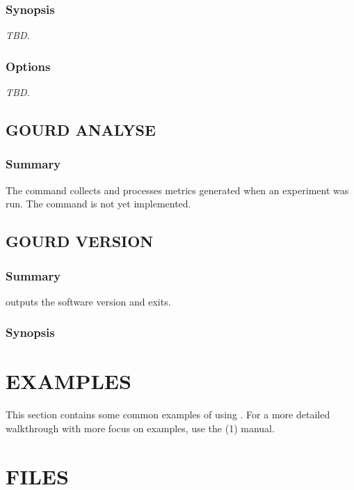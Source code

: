 \documentclass[a4paper,english]{article}
\begin{document}
            \subsubsection{Synopsis}
                \emph{TBD.}

            \subsubsection{Options}
                \emph{TBD.}


        \subsection{GOURD ANALYSE}

            \subsubsection{Summary}
                The   command collects and processes metrics generated
                when an experiment was run.
                The command is not yet implemented.

        \subsection{GOURD VERSION}

            \subsubsection{Summary}
                  outputs the software version and exits.

            \subsubsection{Synopsis}
                  


    \section{EXAMPLES}

        This section contains some common examples of using .
        For a more detailed walkthrough with more focus on examples, use the (1) manual.




    \section{FILES}
\end{document}
